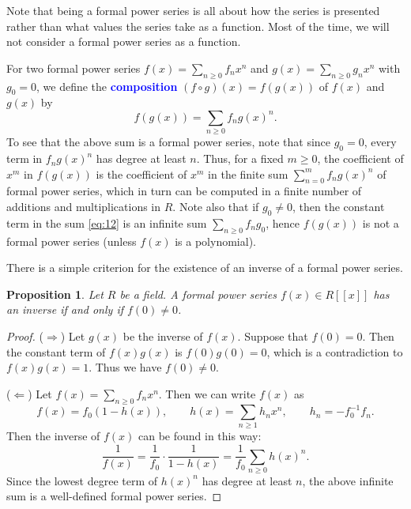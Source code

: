 \documentclass[oneside]{book}
\numberwithin{equation}{section}
\newtheorem{prop}[thm]{Proposition}
\theoremstyle{definition}
\renewcommand\emph[1]{\textcolor{blue}{\bf #1}}
\begin{document}
Note that being a formal power series is all about how the series is
presented rather than what values the series take as a function. Most
of the time, we will not consider a formal power series as a function.

For two formal power series \( f(x) = \sum_{n\ge0} f_n x^n \) and
\( g(x) = \sum_{n\ge0} g_n x^n \) with \( g_0=0 \), we define the
\emph{composition} \( (f\circ g)(x) = f(g(x)) \) of \( f(x) \) and
\( g(x) \) by
\begin{equation}\label{eq:12}
  f(g(x)) = \sum_{n\ge0} f_n g(x)^n.
\end{equation}
To see that the above sum is a formal power series, note that since
\( g_0=0 \), every term in \( f_ng(x)^n \) has degree at least
\( n \). Thus, for a fixed \( m\ge0 \), the coefficient of \( x^m \)
in \( f(g(x)) \) is the coefficient of \( x^m \) in the finite sum
\( \sum_{n=0}^m f_n g(x)^n \) of formal power series, which in turn
can be computed in a finite number of additions and multiplications in
\( R \). Note also that if \( g_0\ne 0 \), then the constant term in
the sum \eqref{eq:12} is an infinite sum \( \sum_{n\ge0} f_n g_0 \),
hence \( f(g(x)) \) is not a formal power series (unless \( f(x) \) is
a polynomial).

There is a simple criterion for the existence of an inverse of a
formal power series.

\begin{prop}
  Let \( R \) be a field. A formal power series \( f(x)\in R[[x]] \)
  has an inverse if and only if \( f(0)\ne 0 \).
\end{prop}
\begin{proof}
  (\(\Rightarrow\)) Let \( g(x) \) be the inverse of \( f(x) \).
  Suppose that \( f(0)=0 \). Then the constant term of \( f(x)g(x) \)
  is \( f(0)g(0)=0 \), which is a contradiction to \( f(x)g(x) = 1 \).
  Thus we have \( f(0)\ne 0 \).

  (\(\Leftarrow\)) Let \( f(x) = \sum_{n\ge 0} f_nx^n \).
  Then we can write \( f(x) \) as
  \[
    f(x) = f_0 \left( 1 - h(x) \right),
    \qquad h(x) = \sum_{n\ge 1} h_n x^n, \qquad h_n = - f_0^{-1}f_n.
  \]
  Then the inverse of \( f(x) \) can be found in this way:
  \[
    \frac{1}{f(x)} = \frac{1}{f_0} \cdot \frac{1}{1-h(x)}
    = \frac{1}{f_0} \sum_{n\ge0} h(x)^n.
  \]
  Since the lowest degree term of \( h(x)^n \) has degree at least \( n \),
  the above infinite sum is a well-defined formal power series.
\end{proof}
\end{document}
